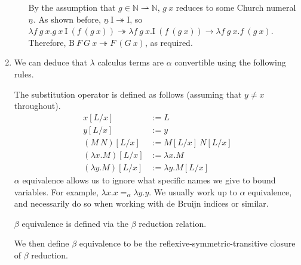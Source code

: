 \documentclass{article}
\begin{document}
\begin{enumerate}
\begin{enumerate}[label=\arabic*.]
        By the assumption that $g \in \mathbb N \rightharpoonup \mathbb N$, $g~x$ reduces to some Church numeral $\underline n$. As shown before, $\underline n~\mathrm I \twoheadrightarrow \mathrm I$, so $\lambda f~g~x.g~x~\mathrm I~(f~(g~x)) \twoheadrightarrow \lambda f~g~x.\mathrm I~(f~(g~x)) \rightarrow \lambda f~g~x.f~(g~x)$. Therefore, $\mathrm B~F~G~x \twoheadrightarrow F~(G~x)$, as required.
    \end{enumerate}
  \item
    We can deduce that $\lambda$ calculus terms are $\alpha$ convertible using the following rules.
    The substitution operator is defined as follows (assuming that $y \neq x$ throughout).
    \begin{align*}
      x[L/x] & := L
      \\
      y[L/x] & := y
      \\
      (M~N)[L/x] & := M[L/x]~N[L/x]
      \\
      (\lambda x.M)[L/x] & := \lambda x.M
      \\
      (\lambda y.M)[L/x] & := \lambda y.M[L/x]
    \end{align*}
    $\alpha$ equivalence allows us to ignore what specific names we give to bound variables. For example, $\lambda x.x =_\alpha \lambda y.y$. We usually work up to $\alpha$ equivalence, and necessarily do so when working with de Bruijn indices or similar.

    $\beta$ equivalence is defined via the $\beta$ reduction relation.
    We then define $\beta$ equivalence to be the reflexive-symmetric-transitive closure of $\beta$ reduction.


\end{enumerate}
\end{document}
